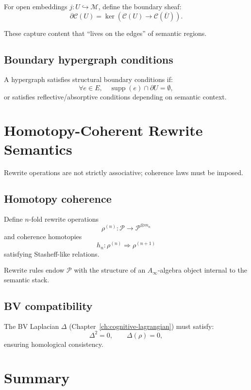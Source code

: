 For open embeddings $j:U\hookrightarrow \mathcal{M}$, define the boundary
sheaf:
\[
\partial\mathscr{C}(U)
=
\ker\left(\mathscr{C}(U)\to\mathscr{C}(\overline{U})\right).
\]

These capture content that “lives on the edges” of semantic regions.

\subsection{Boundary hypergraph conditions}

A hypergraph satisfies structural boundary conditions if:
\[
\forall e\in E,\quad \operatorname{supp}(e) \cap \partial U=\emptyset,
\]
or satisfies reflective/absorptive conditions depending on semantic context.

\section{Homotopy-Coherent Rewrite Semantics}

Rewrite operations are not strictly associative; coherence laws must be imposed.

\subsection{Homotopy coherence}

Define $n$-fold rewrite operations
\[
\rho^{(n)}: \mathscr{P}\to\mathscr{P}^{\otimes m_n}
\]
and coherence homotopies
\[
h_n : \rho^{(n)} \Rightarrow \rho^{(n+1)}
\]
satisfying Stasheff-like relations.

\begin{definition}
Rewrite rules endow $\mathscr{P}$ with the structure of an
$A_\infty$-algebra object internal to the semantic stack.
\end{definition}

\subsection{BV compatibility}

The BV Laplacian $\Delta$ (Chapter~\ref{ch:cognitive-lagrangian}) must satisfy:
\[
\Delta^2 = 0,\qquad
\Delta(\rho) = 0,
\]
ensuring homological consistency.

\section{Summary}

